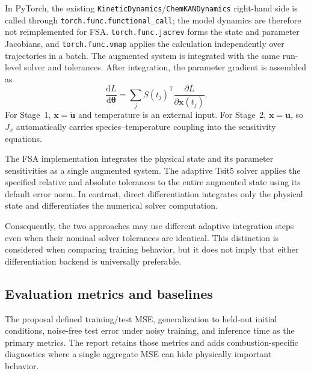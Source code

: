 \documentclass[11pt,a4paper]{article}
\newcommand{\dd}{\mathrm{d}}
\begin{document}
In PyTorch, the existing \texttt{KineticDynamics}/\texttt{ChemKANDynamics} right-hand side is called through \texttt{torch.func.functional\_call}; the model dynamics are therefore not reimplemented for FSA. \texttt{torch.\allowbreak  func.jacrev} forms the state and parameter Jacobians, and \texttt{torch.func.vmap} applies the calculation independently over trajectories in a batch. The augmented system is integrated with the same run-level solver and tolerances. After integration, the parameter gradient is assembled as
\begin{equation}
    \frac{\dd L}{\dd\boldsymbol{\theta}}
    =\sum_j S(t_j)^{\mathsf T}\frac{\partial L}{\partial\mathbf{x}(t_j)}.
\end{equation}
For Stage~1, $\mathbf{x}=\widetilde{\mathbf{u}}$ and temperature is an external input. For Stage~2, $\mathbf{x}=\mathbf{u}$, so $J_x$ automatically carries species--temperature coupling into the sensitivity equations.

The FSA implementation integrates the physical state
and its parameter sensitivities as a single augmented
system. The adaptive Tsit5 solver applies the specified
relative and absolute tolerances to the entire augmented
state using its default error norm. In contrast,
direct differentiation integrates only the physical
state and differentiates the numerical solver computation.

Consequently, the two approaches may use different
adaptive integration steps even when their nominal
solver tolerances are identical. This distinction is
considered when comparing training behavior, but it
does not imply that either differentiation backend
is universally preferable.

\subsection{Evaluation metrics and baselines}

The proposal defined training/test MSE, generalization to held-out initial conditions, noise-free test error under noisy training, and inference time as the primary metrics. The report retains those metrics and adds combustion-specific diagnostics where a single aggregate MSE can hide physically important behavior.
\end{document}
